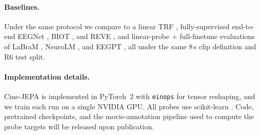 \paragraph{Baselines.}
Under the same protocol we compare to a linear TRF
\citep{crosse2016mtrf}, fully-supervised end-to-end EEGNet
\citep{lawhern2018eegnet}, BIOT \citep{yang2023biot}, and REVE
\citep{elouahidi2025reve}, and linear-probe + full-finetune
evaluations of LaBraM \citep{jiang2024labram}, NeuroLM
\citep{jiang2024neurolm}, and EEGPT \citep{wang2024eegpt}, all under
the same $8$\,s clip definition and R6 test split.

\paragraph{Implementation details.}
Cine-JEPA is implemented in PyTorch~$2$ \citep{paszke2019pytorch} with
\texttt{einops} for tensor reshaping, and we train each run on a
single NVIDIA GPU. All probes use scikit-learn
\citep{pedregosa2011sklearn}. Code, pretrained checkpoints, and the
movie-annotation pipeline used to compute the probe targets will be
released upon publication.
